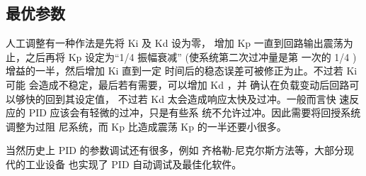 \documentclass{thuemp}
\begin{document}
\subsection{最优参数}
人工调整有一种作法是先将 Ki 及 Kd 设为零，
增加 Kp 一直到回路输出震荡为止，之后再将 Kp
设定为“1/4 振幅衰减” (使系统第二次过冲量是第
一次的 1/4 ) 增益的一半，然后增加 Ki 直到一定
时间后的稳态误差可被修正为止。不过若 Ki 可能
会造成不稳定，最后若有需要，可以增加 Kd ，并
确认在负载变动后回路可以够快的回到其设定值，
不过若 Kd 太会造成响应太快及过冲。一般而言快
速反应的 PID 应该会有轻微的过冲，只是有些系
统不允许过冲。因此需要将回授系统调整为过阻
尼系统，而 Kp 比造成震荡 Kp 的一半还要小很多。\cite{PID}

当然历史上 PID 的参数调试还有很多，例如
齐格勒-尼克尔斯方法等，大部分现代的工业设备
也实现了 PID 自动调试及最佳化软件。



\renewcommand\refname{\heiti\wuhao\centerline{参考文献}\global\def\refname{参考文献}}
\vskip 12pt

\let\OLDthebibliography\thebibliography
\renewcommand\thebibliography[1]{
  \OLDthebibliography{#1}
  \setlength{\parskip}{0pt}
  \setlength{\itemsep}{0pt plus 0.3ex}
}

{
\renewcommand{\baselinestretch}{0.9}
\liuhao


}
\end{document}
